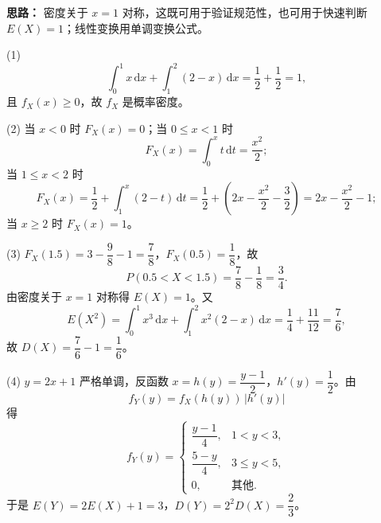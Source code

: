 \ifshowsolutions%
\textbf{思路：} 密度关于 $x=1$ 对称，这既可用于验证规范性，也可用于快速判断 $E(X)=1$；线性变换用单调变换公式。

(1)
\[
\int_0^1x\,\mathrm{d}x+\int_1^2(2-x)\,\mathrm{d}x=\frac12+\frac12=1,
\]
且 $f_X(x)\geq0$，故 $f_X$ 是概率密度。

(2) 当 $x<0$ 时 $F_X(x)=0$；当 $0\leq x<1$ 时
\[
F_X(x)=\int_0^x t\,\mathrm{d}t=\frac{x^2}{2};
\]
当 $1\leq x<2$ 时
\[
F_X(x)=\frac12+\int_1^x(2-t)\,\mathrm{d}t
=\frac12+\left(2x-\frac{x^2}{2}-\frac32\right)
=2x-\frac{x^2}{2}-1;
\]
当 $x\geq2$ 时 $F_X(x)=1$。

(3) $F_X(1.5)=3-\dfrac{9}{8}-1=\dfrac78$，$F_X(0.5)=\dfrac18$，故
\[
P(0.5<X<1.5)=\frac78-\frac18=\frac34.
\]
由密度关于 $x=1$ 对称得 $E(X)=1$。又
\[
E(X^2)=\int_0^1x^3\,\mathrm{d}x+\int_1^2x^2(2-x)\,\mathrm{d}x
=\frac14+\frac{11}{12}=\frac76,
\]
故 $D(X)=\dfrac76-1=\dfrac16$。

(4) $y=2x+1$ 严格单调，反函数 $x=h(y)=\dfrac{y-1}{2}$，$h'(y)=\dfrac12$。由
\[
f_Y(y)=f_X(h(y))\,|h'(y)|
\]
得
\[
f_Y(y)=\begin{cases}
\dfrac{y-1}{4}, & 1<y<3,\\[6pt]
\dfrac{5-y}{4}, & 3\leq y<5,\\[6pt]
0, & \text{其他}.
\end{cases}
\]
于是 $E(Y)=2E(X)+1=3$，$D(Y)=2^2D(X)=\dfrac23$。

\else \answerarea[10] \fi%
